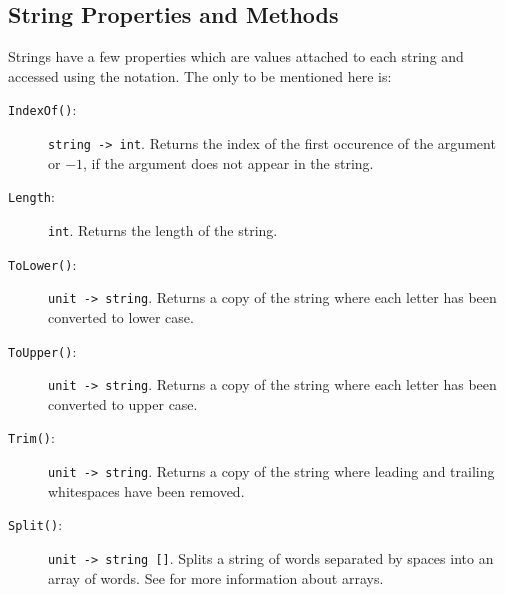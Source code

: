 \subsection{String Properties and Methods}
Strings have a few properties which are values attached to each string and accessed using the  notation. The only to be mentioned here is:
\begin{description}
\item[\texttt{IndexOf()}:] \lstinline{string -> int}. Returns the index of the first occurence of the argument or $-1$, if the argument does not appear in the string.
\item[\texttt{Length}:] \lstinline{int}. Returns the length of the string.
\item[\texttt{ToLower()}:] \lstinline{unit -> string}. Returns a copy of the string where each letter has been converted to lower case.
\item[\texttt{ToUpper()}:] \lstinline{unit -> string}. Returns a copy of the string where each letter has been converted to upper case.
\item[\texttt{Trim()}:] \lstinline{unit -> string}. Returns a copy of the string where leading and trailing whitespaces have been removed.
\item[\texttt{Split()}:] \lstinline{unit -> string []}. Splits a string of words separated by spaces into an array of words. See  for more information about arrays.
\end{description}

